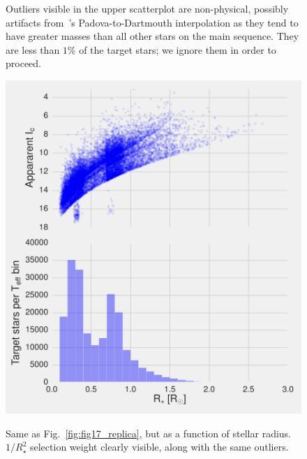 \begin{figure}[!th]
{		Outliers visible in the upper scatterplot are non-physical,
		possibly artifacts from~'s
		Padova-to-Dartmouth interpolation as they tend to have greater
		masses than all other stars on the main sequence. They are
		less than $1\%$ of the target stars; we ignore them in order
		to proceed.
	}
\end{figure}
\begin{figure}[!th]
	\includegraphics{figures/fig17_radius_on_x.pdf}
	\label{fig:fig17_radius_on_x}
	\caption{Same as Fig.~\protect\ref{fig:fig17_replica}, but as a function of stellar radius. $1/R_\star^2$ selection weight clearly visible, along with the same outliers.
	}
\end{figure}


